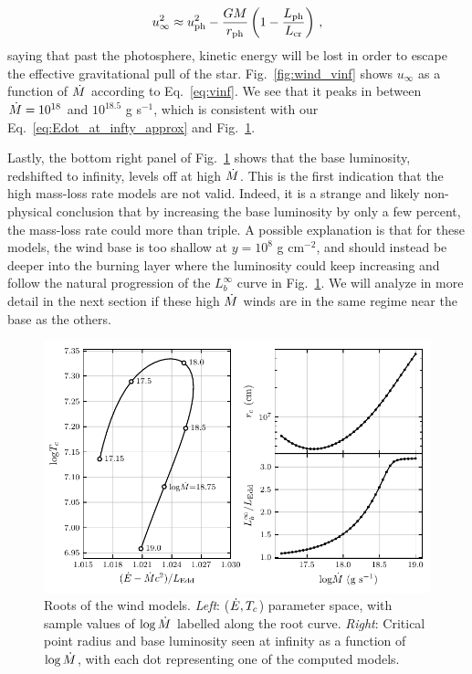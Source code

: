 \documentclass[../main.tex]{subfiles}
\begin{document}
\begin{equation}\label{eq:vinf}
    u_\infty^2 \approx u_\text{ph}^2 - \frac{GM}{r_\text{ph}}\left(1-\frac{L_\text{ph}}{L_\text{cr}}\right)\, ,
\end{equation}
saying that past the photosphere, kinetic energy will be lost in order to escape the effective gravitational pull of the star. Fig.~\ref{fig:wind_vinf} shows $u_\infty$ as a function of $\dot{M}$ according to Eq.~\eqref{eq:vinf}. We see that it peaks in between $\dot{M}=10^{18}$ and $10^{18.5}$ g s$^{-1}$, which is consistent with our Eq.~\eqref{eq:Edot_at_infty_approx} and Fig.~\ref{fig:wind_roots}. 

Lastly, the bottom right panel of Fig.~\ref{fig:wind_roots} shows that the base luminosity, redshifted to infinity, levels off at high $\dot{M}$. This is the first indication that the high mass-loss rate models are not valid. Indeed, it is a strange and likely non-physical conclusion that by increasing the base luminosity by only a few percent, the mass-loss rate could more than triple. A possible explanation is that for these models, the wind base is too shallow at $y=10^8$ g cm$^{-2}$, and should instead be deeper into the burning layer where the luminosity could keep increasing and follow the natural progression of the $L_b^\infty$ curve in Fig.~\ref{fig:wind_roots}. We will analyze in more detail in the next section if these high $\dot{M}$ winds are in the same regime near the base as the others.


\begin{figure}[htb!]
    \centering
    \includegraphics[width=\textwidth]{figures/wind_roots.pdf}
    \caption[Roots of wind models]{Roots of the wind models. \textit{Left}: ($\dot{E},T_c$) parameter space, with sample values of $\log\dot{M}$ labelled along the root curve. \textit{Right}: Critical point radius and base luminosity seen at infinity as a function of $\log\dot{M}$, with each dot representing one of the computed models.}
    \label{fig:wind_roots}
\end{figure}
\end{document}
